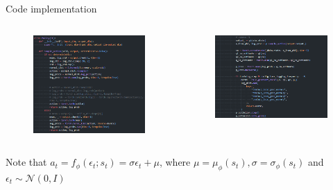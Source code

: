 \documentclass[8pt]{beamer}
\begin{document}
\begin{frame}{Code implementation}
    \begin{columns}
        \begin{column}{0.5\textwidth}
            \begin{figure}
                \centering
                \includegraphics[width=1.0\textwidth]{NotCoVPolicy.png}
            \end{figure}
        \end{column}
        \begin{column}{0.5\textwidth}
            \begin{figure}
                \centering
                \includegraphics[width=1.0\textwidth]{UpdateP.png}
            \end{figure}
        \end{column}
    \end{columns}


    Note that $a_t = f_\phi (\epsilon_t; s_t) = \sigma \epsilon_t + \mu$, where $\mu = \mu_\phi(s_t), \sigma=\sigma_\phi (s_t)$ and $\epsilon_t \sim \mathcal{N}(0, I)$
\end{frame}
\end{document}
